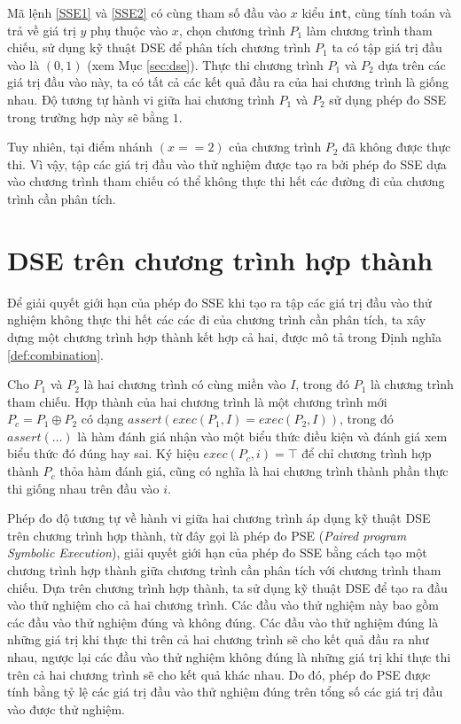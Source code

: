Mã lệnh \ref{SSE1} và \ref{SSE2} có cùng tham số đầu vào $ x $ kiểu 
\texttt{int}, cùng tính toán và trả về giá trị $ y $ phụ thuộc vào $ x $, 
chọn chương trình $P_{1}$ làm chương trình tham chiếu, sử dụng kỹ 
thuật DSE để phân tích chương trình $P_{1}$ ta có tập giá trị đầu vào 
là $(0, 1)$ (xem Mục \ref{sec:dse}). Thực thi chương trình $P_{1}$ và 
$P_{2}$ dựa trên các giá trị đầu vào này, ta có tất cả các kết quả 
đầu ra của hai chương trình là giống nhau. Độ tương tự hành vi 
giữa hai chương trình $P_{1}$ và $P_{2}$ sử dụng phép đo SSE trong 
trường hợp này sẽ bằng $ 1 $.

Tuy nhiên, tại điểm nhánh $ (x == 2) $ của chương trình $ P_{2} $ 
đã không được thực thi. Vì vậy, tập các giá trị đầu vào thử nghiệm được tạo 
ra bởi phép đo SSE dựa vào chương trình tham chiếu có thể không 
thực thi hết các đường đi của chương trình cần phân tích.

\section{DSE trên chương trình hợp thành}

Để giải quyết giới hạn của phép đo SSE khi tạo ra tập các giá trị đầu
vào thử nghiệm không thực thi hết các các đi của chương trình cần phân
tích, ta xây dựng một chương trình hợp thành kết hợp cả hai, được mô
tả trong Định nghĩa \ref{def:combination}.

\begin{definition}
  \label{def:combination}
  Cho $P_1$ và $P_2$ là hai chương trình có cùng miền vào $I$, trong đó
  $P_1$ là chương trình tham chiếu. Hợp thành của hai chương trình là
  một chương trình mới $P_c = P_1 \oplus P_2$ có dạng
  $assert(exec(P_{1}, I) = exec(P_{2}, I))$, trong đó $assert(\dots)$
  là hàm đánh giá nhận vào một biểu thức điều kiện và đánh giá xem
  biểu thức đó đúng hay sai. Ký hiệu $exec(P_c,i) = \top$ để chỉ
  chương trình hợp thành $P_c$ thỏa hàm đánh giá, cũng có nghĩa là hai
  chương trình thành phần thực thi giống nhau trên đầu vào $i$.
\end{definition}

Phép đo độ tương tự về hành vi giữa hai chương trình áp dụng kỹ thuật
DSE trên chương trình hợp thành, từ đây gọi là phép đo PSE
(\emph{Paired program Symbolic Execution}), giải quyết giới hạn của
phép đo SSE bằng cách tạo một chương trình hợp thành giữa chương trình
cần phân tích với chương trình tham chiếu. Dựa trên chương trình hợp
thành, ta sử dụng kỹ thuật DSE để tạo ra đầu vào thử nghiệm cho cả hai
chương trình. Các đầu vào thử nghiệm này bao gồm các đầu vào thử
nghiệm đúng và không đúng. Các đầu vào thử nghiệm đúng là những giá
trị khi thực thi trên cả hai chương trình sẽ cho kết quả đầu ra như
nhau, ngược lại các đầu vào thử nghiệm không đúng là những giá trị khi
thực thi trên cả hai chương trình sẽ cho kết quả khác nhau. Do đó,
phép đo PSE được tính bằng tỷ lệ các giá trị đầu vào thử
nghiệm đúng trên tổng số các giá trị đầu vào được thử nghiệm.

